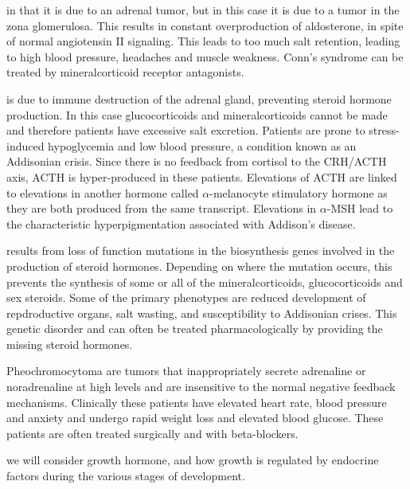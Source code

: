 \documentclass{tufte-handout}
\begin{document}
 in that it is due to an adrenal tumor, but in this case it is due to a tumor in the zona glomerulosa.  This results in constant overproduction of aldosterone, in spite of normal angiotensin II signaling.  This leads to too much salt retention, leading to high blood pressure, headaches and muscle weakness.  Conn's syndrome can be treated by mineralcorticoid receptor antagonists.

 is due to immune destruction of the adrenal gland, preventing steroid hormone production.  In this case glucocorticoids and mineralcorticoids cannot be made and therefore patients have excessive salt excretion.  Patients are prone to stress-induced hypoglycemia and low blood pressure, a condition known as an Addisonian crisis.  Since there is no feedback from cortisol to the CRH/ACTH axis, ACTH is hyper-produced in these patients.  Elevations of ACTH are linked to elevations in another hormone called $\alpha$-melanocyte stimulatory hormone as they are both produced from the same transcript.  Elevations in $\alpha$-MSH lead to the characteristic hyperpigmentation associated with Addison's disease. 

 results from loss of function mutations in the biosynthesis genes involved in the production of steroid hormones.  Depending on where the mutation occurs, this prevents the synthesis of some or all of the mineralcorticoids, glucocorticoids and sex steroids.  Some of the primary phenotypes are reduced development of repdroductive organs, salt wasting, and susceptibility to Addisonian crises.  This genetic disorder and can often be treated pharmacologically by providing the missing steroid hormones.

  Pheochromocytoma are tumors that inappropriately secrete adrenaline or noradrenaline at high levels and are insensitive to the normal negative feedback mechanisms.  Clinically these patients have elevated heart rate, blood pressure and anxiety and undergo rapid weight loss and elevated blood glucose.  These patients are often treated surgically and with beta-blockers.

 we will consider growth hormone, and how growth is regulated by endocrine factors during the various stages of development.
\listoffigures
\listoftables



\end{document}
